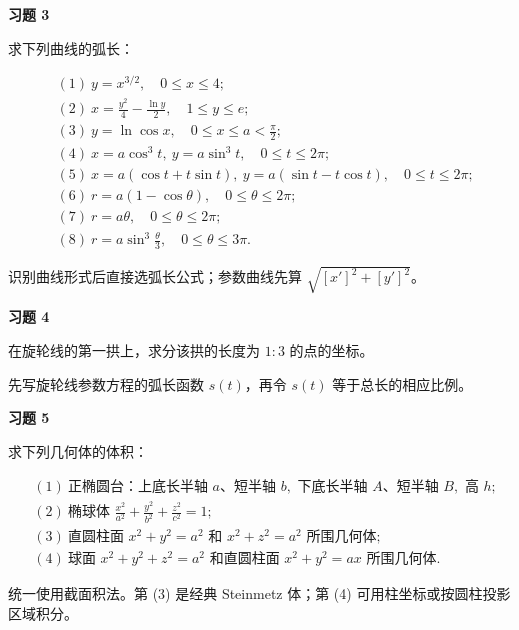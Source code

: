 \begin{exercisebox}
\textbf{习题 3 }

求下列曲线的弧长：

\[
      \begin{aligned}
      &(1)\ y=x^{3/2},\quad0\le x\le4;\\
      &(2)\ x=\frac{y^2}{4}-\frac{\ln y}{2},\quad1\le y\le e;\\
      &(3)\ y=\ln\cos x,\quad0\le x\le a<\frac{\pi}{2};\\
      &(4)\ x=a\cos^3t,\ y=a\sin^3t,\quad0\le t\le2\pi;\\
      &(5)\ x=a(\cos t+t\sin t),\ y=a(\sin t-t\cos t),\quad0\le t\le2\pi;\\
      &(6)\ r=a(1-\cos\theta),\quad0\le\theta\le2\pi;\\
      &(7)\ r=a\theta,\quad0\le\theta\le2\pi;\\
      &(8)\ r=a\sin^3\frac{\theta}{3},\quad0\le\theta\le3\pi.
      \end{aligned}
      \]

\begin{hintbox}
识别曲线形式后直接选弧长公式；参数曲线先算 \(\sqrt{[x']^2+[y']^2}\)。
\end{hintbox}
\end{exercisebox}

\begin{exercisebox}
\textbf{习题 4 }

在旋轮线的第一拱上，求分该拱的长度为 \(1:3\) 的点的坐标。

\begin{hintbox}
先写旋轮线参数方程的弧长函数 \(s(t)\)，再令 \(s(t)\) 等于总长的相应比例。
\end{hintbox}
\end{exercisebox}

\begin{exercisebox}
\textbf{习题 5 }

求下列几何体的体积：

\[
      \begin{aligned}
      &(1)\ \text{正椭圆台：上底长半轴 }a\text{、短半轴 }b,\text{ 下底长半轴 }A\text{、短半轴 }B,\text{ 高 }h;\\
      &(2)\ \text{椭球体 }\frac{x^2}{a^2}+\frac{y^2}{b^2}+\frac{z^2}{c^2}=1;\\
      &(3)\ \text{直圆柱面 }x^2+y^2=a^2\text{ 和 }x^2+z^2=a^2\text{ 所围几何体};\\
      &(4)\ \text{球面 }x^2+y^2+z^2=a^2\text{ 和直圆柱面 }x^2+y^2=ax\text{ 所围几何体}.
      \end{aligned}
      \]

\begin{hintbox}
统一使用截面积法。第 (3) 是经典 Steinmetz 体；第 (4) 可用柱坐标或按圆柱投影区域积分。
\end{hintbox}
\end{exercisebox}

